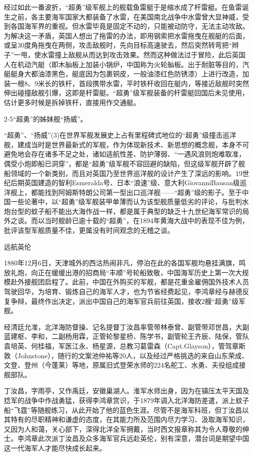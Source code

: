 \documentclass[12pt,UTF8]{ctexbook}
\begin{document}
经过如此一番波折，“超勇”级军舰上的舰载鱼雷艇于是缩水成了杆雷艇。在鱼雷诞生之前，各主要海军国家大都装备了水雷，在美国南北战争中水雷曾大显神威，受到各国海军界的重视。但水雷毕竟是固定不动的，只能被动防守，无法主动攻敌。为解决这一矛盾，英国人想出了拖雷的办法，即用钢索把水雷拖曳在舰艇的后面，或呈30度角拖曳在两侧，攻击敌舰时，先向目标高速驶去，然后突然转弯把“辫子”一甩，使水雷撞上敌舰从而达到攻击效果。然而这种做法过于冒险，此后英国人在机动汽艇（即木舢板上加装小锅炉，中国称为火轮舢板。出于耐脏等目的，汽艇艇身大都油漆黑色，艇底因为包裹铜皮，一般油漆红色防锈漆）上进行改造，加装一根8、9米长的铁杆，首段携带水雷，平时铁杆收回在艇内，等接近敌舰时突然伸出碰撞敌舰引爆，这即是杆雷艇。“超勇”级军舰装备的杆雷艇回国后未见使用，估计更多时候是拆掉铁杆，直接用作交通艇。

2-5“超勇”的姊妹舰“扬威”。

“超勇”、“扬威”(3)在世界军舰发展史上占有里程碑式地位的“超勇”级撞击巡洋舰，建成当时是世界最新式的军舰，作为体现新技术、新思想的概念舰，本身不可避免地会存在诸多不足之处，诸如适航性差、防护薄弱、“一遇风浪则炮难取准，偶受小炮即船已洞穿”，都是“超勇”级军舰不容回避的缺陷，但这级军舰开辟了舰船领域的一个新类别，而且对英国乃至世界巡洋舰的设计产生了深远的影响。19世纪后期英国建造的智利Esmeralda号、日本“浪速”级、意大利GiovanniBausan级巡洋舰上，都能找到阿姆斯特朗公司第一型出口巡洋舰——“超勇”级的影子。至于中国一些论著中，以“超勇”级军舰装甲单薄而认为该型舰质量低劣的评论，与批判水炮台型的蚊子船不能出大海作战一样，都是属于典型的缺乏十九世纪海军常识的局外之谈。而以当时舰龄已逾十载的“超勇”，在1894年黄海大战中的表现不佳为例，批评该型军舰质量不佳，更属没有时间观念的无稽之谈。

远航英伦

1880年12月6日，天津城外的西沽热闹非凡，停泊在此的各国军舰均悬挂满旗，鸣放礼炮，向正在缓缓出港的招商局“丰顺”号轮船致敬，中国海军历史上第一次大规模赴外接舰团启程了。此前，中国在外购买的军舰，都是花重金雇佣国外技术人员驾驶回华，为培育、锻炼自己的海军人才，也为节省经费起见，李鸿章经与赫德反复争辩，最终作出决定，派出中国自己的海军官兵前往英国，接收2艘“超勇”级军舰。

经清廷允准，北洋海防督操、记名提督丁汝昌率管带林泰曾、副管带邓世昌，大副蓝建枢、李和，二副杨用霖，正管轮黎星桥、陈学书，副管轮王齐辰、陆保，管队袁培英、何桂福，军医江永、杨星源，总教习葛雷森（Capt.Glayson），管驾章斯敦（Johnstone），随行的文案池仲祐等20人，以及经过严格挑选的来自山东荣成、文登、登州（今蓬莱）等地，原属旧式登荣水师的224名舵工、水勇、夫役组成接舰部队。

丁汝昌，字雨亭，又作禹廷，安徽巢湖人。淮军水师出身，因为在镇压太平天国及捻军的战争中作战勇猛，获得李鸿章赏识，于1879年调入北洋海防差遣，派上蚊子船“飞霆”等随舰练习，从此开始了他的蓝色生涯。尽管不是海军科班，但丁汝昌以其特有的尽职精神和谦虚的态度，在其能力所及范围内尽力学习、汲取海军知识，又因为人和蔼，关心部下，深得北洋全军拥戴，当时西文报章称其为令人尊敬的绅士。李鸿章此次派丁汝昌及众多海军官兵远赴英伦，别有深意，潜台词是期望中国这一代海军人才能尽快成长起来。
\end{document}
